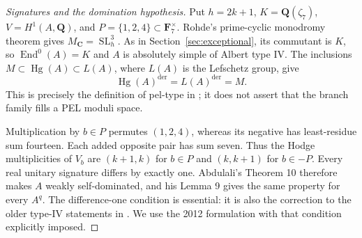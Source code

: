 \documentclass[11pt]{article}
\theoremstyle{definition}
\newcommand{\Q}{\mathbf Q}
\newcommand{\C}{\mathbf C}
\newcommand{\F}{\mathbf F}
\newcommand{\SL}{\operatorname{SL}}
\newcommand{\Hg}{\operatorname{Hg}}
\newcommand{\End}{\operatorname{End}}
\begin{document}
\begin{proof}[Signatures and the domination hypothesis]
Put $h=2k+1$, $K=\Q(\zeta_7)$, $V=H^1(A,\Q)$, and
$P=\{1,2,4\}\subset\F_7^\times$.
Rohde's prime-cyclic monodromy theorem
\cite[Theorem 5.3.7]{Rohde} gives $M_\C=\SL_h^3$.
As in Section~\ref{sec:exceptional}, its commutant is $K$, so
$\End^0(A)=K$ and $A$ is absolutely simple of Albert type IV.
The inclusions $M\subset\Hg(A)\subset L(A)$, where $L(A)$ is the
Lefschetz group, give
\[
                   \Hg(A)^{\mathrm{der}}=L(A)^{\mathrm{der}}=M.
\]
This is precisely the definition of pel-type in \cite[Section 2]{Abdulali12};
it does not assert that the branch family fills a PEL moduli space.

Multiplication by $b\in P$ permutes $(1,2,4)$, whereas its negative has
least-residue sum fourteen. Each added opposite pair has sum seven.
Thus the Hodge multiplicities of $V_b$ are $(k+1,k)$ for $b\in P$
and $(k,k+1)$ for $b\in-P$. Every real unitary signature differs by
exactly one. Abdulali's Theorem 10 therefore makes $A$ weakly
self-dominated, and his Lemma 9 gives the same property for every
$A^q$. The difference-one condition is essential: it is also the
correction to the older type-IV statements in
\cite[Appendix B.5]{AbdulaliSurvey}. We use the 2012 formulation with
that condition explicitly imposed.
\end{proof}
\end{document}
